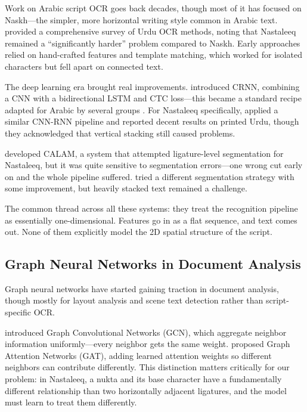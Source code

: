 \documentclass[11pt]{article}
\begin{document}
Work on Arabic script OCR goes back decades, though most of it has focused on
Naskh---the simpler, more horizontal writing style common in Arabic text.
\citet{naz2016survey} provided a comprehensive survey of Urdu OCR methods, noting
that Nastaleeq remained a ``significantly harder'' problem compared to Naskh.
Early approaches relied on hand-crafted features and template matching, which worked for
isolated characters but fell apart on connected text.

The deep learning era brought real improvements.
\citet{shi2017crnn} introduced CRNN, combining a CNN with a bidirectional LSTM and CTC
loss---this became a standard recipe adapted for Arabic by several groups
\citep{bluche2017gated, yousef2020accurate}.
For Nastaleeq specifically, \citet{naz2017nastaliq} applied a similar CNN-RNN pipeline
and reported decent results on printed Urdu, though they acknowledged that vertical
stacking still caused problems.

\citet{sabbour2013calam} developed CALAM, a system that attempted ligature-level
segmentation for Nastaleeq, but it was quite sensitive to segmentation errors---one wrong
cut early on and the whole pipeline suffered.
\citet{ulhasan2015offline} tried a different segmentation strategy with some improvement,
but heavily stacked text remained a challenge.

The common thread across all these systems: they treat the recognition pipeline as
essentially one-dimensional.
Features go in as a flat sequence, and text comes out.
None of them explicitly model the 2D spatial structure of the script.

\subsection{Graph Neural Networks in Document Analysis}

Graph neural networks have started gaining traction in document analysis, though mostly
for layout analysis and scene text detection rather than script-specific OCR.

\citet{kipf2017gcn} introduced Graph Convolutional Networks (GCN), which aggregate
neighbor information uniformly---every neighbor gets the same weight.
\citet{velickovic2018gat} proposed Graph Attention Networks (GAT), adding learned
attention weights so different neighbors can contribute differently.
This distinction matters critically for our problem: in Nastaleeq, a nukta and its base
character have a fundamentally different relationship than two horizontally adjacent
ligatures, and the model must learn to treat them differently.
\end{document}
